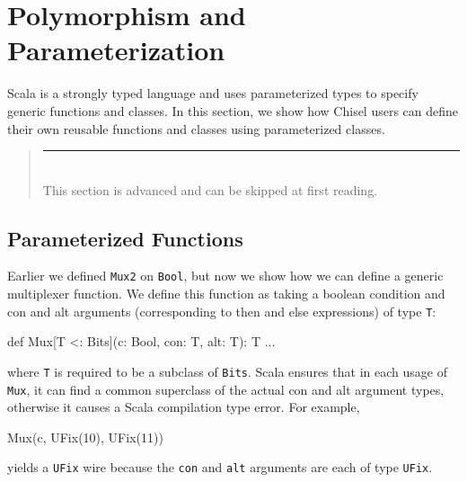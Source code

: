 \documentclass[10pt]{article}
\newenvironment{commentary}
{ \vspace{-0.1in}
  \begin{quotation}
  \noindent
  \small \em
  \rule{\linewidth}{1pt}\\
}
{
  \end{quotation}
}
\def\code#1{{\tt #1}}
\begin{document}
\section{Polymorphism and Parameterization}
\label{sec:parameterization}

Scala is a strongly typed language and uses parameterized types to specify generic functions and classes.  
In this section, we show how Chisel users can define their own reusable functions and classes using parameterized classes.
\begin{commentary}
This section is advanced and can be skipped at first reading.
\end{commentary}

\subsection{Parameterized Functions}

Earlier we defined \code{Mux2} on \code{Bool}, but now we show how we can define a generic multiplexer function.
We define this function as taking a boolean condition and con and alt arguments (corresponding to then and else expressions) of type \code{T}:

\begin{scala}
def Mux[T <: Bits](c: Bool, con: T, alt: T): T { ... }
\end{scala}

\noindent
where \code{T} is required to be a subclass of \code{Bits}.
Scala ensures that in each usage of \code{Mux}, it can find a common superclass of the actual con and alt argument types, 
otherwise it causes a Scala compilation type error.
For example,

\begin{scala}
Mux(c, UFix(10), UFix(11))
\end{scala}

\noindent
yields a \code{UFix} wire because the \code{con} and \code{alt} arguments are each of type \code{UFix}.

% 
% 
\end{document}
